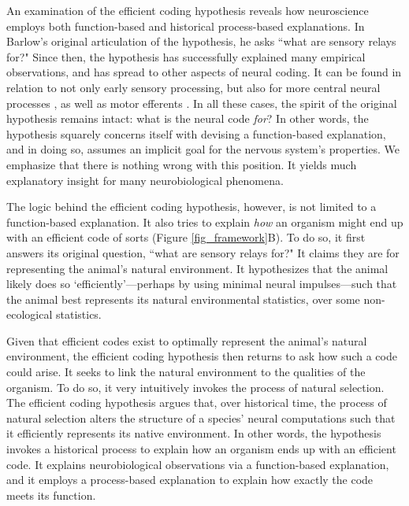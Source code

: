 \documentclass[twocolumn]{article}
\begin{document}
An examination of the efficient coding hypothesis reveals how neuroscience employs both function-based and historical process-based explanations. In Barlow's original articulation of the hypothesis, he asks ``what are sensory relays for?" \cite{Barlow_1961} Since then, the hypothesis has successfully explained many empirical observations, and has spread to other aspects of neural coding. It can be found in relation to not only early sensory processing, but also for more central neural processes \cite{olshausen_field_1996, Pitkow_Meister_2012, brunton_2013}, as well as motor efferents \cite{hoyt_taylor_1981, sparrow_newell_1998, Mimica_Dunn_Tombaz_Bojja_Whitlock_2018}. In all these cases, the spirit of the original hypothesis remains intact: what is the neural code \textit{for}? In other words, the hypothesis squarely concerns itself with devising a function-based explanation, and in doing so, assumes an implicit goal for the nervous system's properties. We emphasize that there is nothing wrong with this position. It yields much explanatory insight for many neurobiological phenomena. 

The logic behind the efficient coding hypothesis, however, is not limited to a function-based explanation. It also tries to explain \textit{how} an organism might end up with an efficient code of sorts (Figure \ref{fig_framework}B). To do so, it first answers its original question, ``what are sensory relays for?" It claims they are for representing the animal's natural environment. It hypothesizes that the animal likely does so `efficiently'---perhaps by using minimal neural impulses---such that the animal best represents its natural environmental statistics, over some non-ecological statistics. 

Given that efficient codes exist to optimally represent the animal's natural environment, the efficient coding hypothesis then returns to ask how such a code could arise. It seeks to link the natural environment to the qualities of the organism. To do so, it very intuitively invokes the process of natural selection. The efficient coding hypothesis argues that, over historical time, the process of natural selection alters the structure of a species' neural computations such that it efficiently represents its native environment. In other words, the hypothesis invokes a historical process to explain how an organism ends up with an efficient code. It explains neurobiological observations via a function-based explanation, and it employs a process-based explanation to explain how exactly the code meets its function. 
\end{document}
